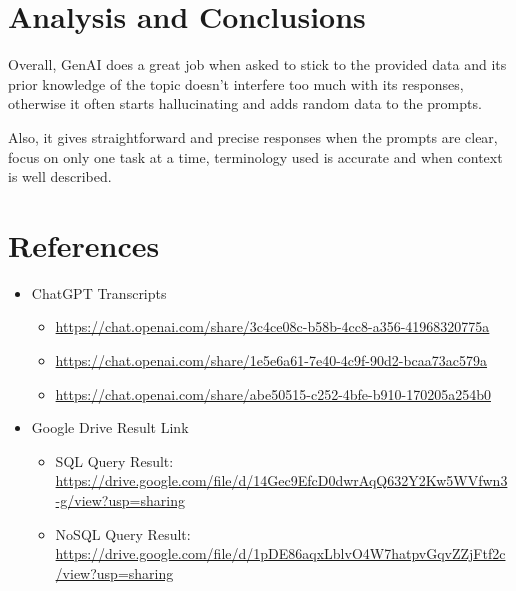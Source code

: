 \documentclass[10pt,onecolumn,letterpaper]{article}
\begin{document}
\section*{Analysis and Conclusions}
Overall, GenAI does a great job when asked to stick to the provided data and its prior knowledge of the topic doesn’t interfere too much with its responses, otherwise it often starts hallucinating and adds random data to the prompts.

Also, it gives straightforward and precise responses when the prompts are clear, focus on only one task at a time, terminology used is accurate and when context is well described.

\section*{References}
\begin{itemize}
  \item ChatGPT Transcripts
  \begin{itemize}
    \item \url{https://chat.openai.com/share/3c4ce08c-b58b-4cc8-a356-41968320775a}
    \item \url{https://chat.openai.com/share/1e5e6a61-7e40-4c9f-90d2-bcaa73ac579a}
    \item \url{https://chat.openai.com/share/abe50515-c252-4bfe-b910-170205a254b0}
  \end{itemize}
  
  \item Google Drive Result Link
   \begin{itemize}
     \item SQL Query Result: \url {https://drive.google.com/file/d/14Gec9EfcD0dwrAqQ632Y2Kw5WVfwn3-g/view?usp=sharing}
     \item NoSQL Query Result: \url {https://drive.google.com/file/d/1pDE86aqxLblvO4W7hatpvGqvZZjFtf2c/view?usp=sharing}
  \end{itemize}
\end{itemize}
\end{document}
